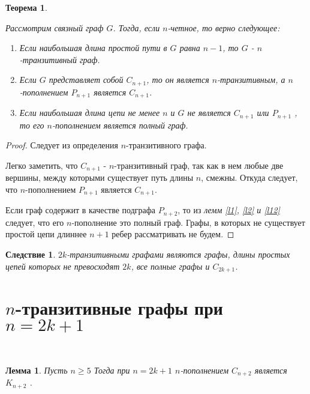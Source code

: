 \documentclass[a4paper,12pt]{article}
\theoremstyle{plain}
\newtheorem{theorem}{Теорема}
\newtheorem{lemma}{Лемма}
\newtheorem*{corollary*}{Следствие}
\theoremstyle{definition}
\begin{document}
	
	
	\begin{theorem}\label{t3}
		{\it Рассмотрим связный граф $G$. Тогда, если $n$-четное, то верно следующее:
\begin{enumerate}

\item[1)] Если наибольшая длина простой пути в $G$ равна $n-1$, то $G$ - $n$-транзитивный граф.
\item[2)] Если $G$ представляет собой $C_{n+1}$, то он является $n$-транзитивным, а $n$-пополнением $P_{n+1}$ является $C_{n+1}$.
\item[3)] Если наибольшая длина цепи не менее $n$ и $G$ не является  $C_{n+1}$ или $P_{n+1}$ , то его $n$-пополнением является полный граф.


\end{enumerate}}
	\end{theorem}
	\begin{proof}
		
		
		\item[1)] Следует из определения $n$-транзитивного графа.
		
		
		\item[2)] Легко заметить, что $C_{n+1}$ - $n$-транзитивный граф, так как в нем любые две вершины, между которыми существует путь длины $n$, смежны. Откуда следует, что $n$-пополнением $P_{n+1}$ является $C_{n+1}$. 
		
		
		\item[3)] Если граф содержит в качестве подграфа $P_{n+2}$, то из \emph{лемм \ref{l1}, \ref{l2} и \ref{l12}} следует, что его $n$-пополнение это полный граф. Графы, в которых не существует простой цепи длиннее $n+1$ ребер рассматривать не будем.
		
	
		\end{proof}
\begin{corollary*}
		{\it $2k$-транзитивными графами являются графы, длины простых цепей которых не превосходят $2k$, все полные графы и $C_{2k+1}$.}
	\end{corollary*}
	
	
	
	\section{ $n$-транзитивные графы при $n=2k+1$ }
	\ \\
	\begin{lemma} \label{l14}
		{\it Пусть $n \geq 5 $ Тогда при $n=2k+1$ $n$-пополнением $C_{n+2}$ является $K_{n+2}$   .}
	\end{lemma}
	
\end{document}
